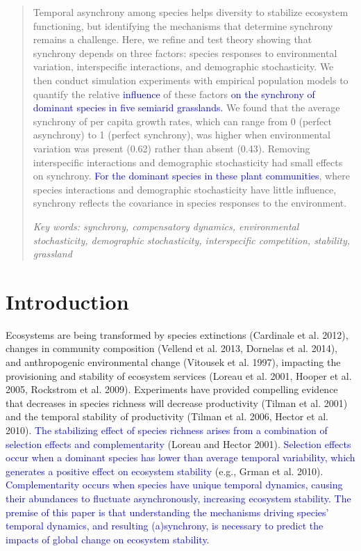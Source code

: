 \documentclass[12pt,]{article}
\begin{document}
\setcounter{footnote}{0}

\newpage{}

\begin{abstract}
Temporal asynchrony among species helps diversity to stabilize ecosystem functioning, but identifying the mechanisms that determine synchrony remains a challenge.
Here, we refine and test theory showing that synchrony depends on three factors: species responses to environmental variation, interspecific interactions, and demographic stochasticity. We then conduct simulation experiments with empirical population models to quantify the relative \textcolor{blue}{influence} of these factors \textcolor{blue}{on the synchrony of dominant species in five semiarid grasslands.}
We found that the average synchrony of per capita growth rates, which can range from 0 (perfect asynchrony) to 1 (perfect synchrony), was higher when environmental variation was present (0.62) rather than absent (0.43).
Removing interspecific interactions and demographic stochasticity had small effects on synchrony. 
\textcolor{blue}{For the dominant species in these plant communities}, where species interactions and demographic stochasticity have little influence, synchrony reflects the covariance in species responses to the environment.

\vspace{1em}

\emph{Key words: synchrony, compensatory dynamics, environmental stochasticity, demographic stochasticity, interspecific competition, stability, grassland}

\end{abstract}

\setlength{\parindent}{5ex}

\section{Introduction}

Ecosystems are being transformed by species extinctions (Cardinale et
al. 2012), changes in community composition (Vellend et al. 2013,
Dornelas et al. 2014), and anthropogenic environmental change (Vitousek
et al. 1997), impacting the provisioning and stability of ecosystem
services (Loreau et al. 2001, Hooper et al. 2005, Rockstrom et al.
2009). Experiments have provided compelling evidence that decreases in
species richness will decrease productivity (Tilman et al. 2001) and the
temporal stability of productivity (Tilman et al. 2006, Hector et al.
2010).
\textcolor{blue}{The stabilizing effect of species richness arises from a combination of selection effects and complementarity}
(Loreau and Hector 2001).
\textcolor{blue}{Selection effects occur when a dominant species has lower than average temporal variability, which generates a positive effect on ecosystem stability}
(e.g., Grman et al. 2010).
\textcolor{blue}{Complementarity occurs when species have unique temporal dynamics, causing their abundances to fluctuate asynchronously, increasing ecosystem stability.}
\textcolor{blue}{The premise of this paper is that understanding the mechanisms driving species' temporal dynamics, and resulting (a)synchrony, is necessary to predict the impacts of global change on ecosystem stability.}
\end{document}
